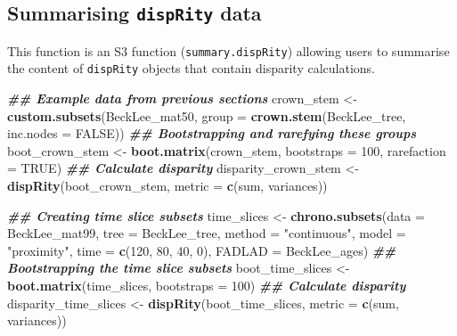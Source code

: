 \documentclass[
]{book}
\newenvironment{Shaded}{\begin{snugshade}}{\end{snugshade}}
\newcommand{\AttributeTok}[1]{\textcolor[rgb]{0.13,0.29,0.53}{#1}}
\newcommand{\ConstantTok}[1]{\textcolor[rgb]{0.56,0.35,0.01}{#1}}
\newcommand{\DecValTok}[1]{\textcolor[rgb]{0.00,0.00,0.81}{#1}}
\newcommand{\DocumentationTok}[1]{\textcolor[rgb]{0.56,0.35,0.01}{\textbf{\textit{#1}}}}
\newcommand{\FunctionTok}[1]{\textcolor[rgb]{0.13,0.29,0.53}{\textbf{#1}}}
\newcommand{\NormalTok}[1]{#1}
\newcommand{\OtherTok}[1]{\textcolor[rgb]{0.56,0.35,0.01}{#1}}
\newcommand{\StringTok}[1]{\textcolor[rgb]{0.31,0.60,0.02}{#1}}
\begin{document}
\hypertarget{summarising-disprity-data}{%
\subsection{\texorpdfstring{Summarising \texttt{dispRity} data}{Summarising dispRity data}}\label{summarising-disprity-data}}

This function is an S3 function (\texttt{summary.dispRity}) allowing users to summarise the content of \texttt{dispRity} objects that contain disparity calculations.

\begin{Shaded}
\begin{Highlighting}[]
\DocumentationTok{\#\# Example data from previous sections}
\NormalTok{crown\_stem }\OtherTok{\textless{}{-}} \FunctionTok{custom.subsets}\NormalTok{(BeckLee\_mat50,}
                             \AttributeTok{group =} \FunctionTok{crown.stem}\NormalTok{(BeckLee\_tree,}
                             \AttributeTok{inc.nodes =} \ConstantTok{FALSE}\NormalTok{))}
\DocumentationTok{\#\# Bootstrapping and rarefying these groups}
\NormalTok{boot\_crown\_stem }\OtherTok{\textless{}{-}} \FunctionTok{boot.matrix}\NormalTok{(crown\_stem, }\AttributeTok{bootstraps =} \DecValTok{100}\NormalTok{,}
                               \AttributeTok{rarefaction =} \ConstantTok{TRUE}\NormalTok{)}
\DocumentationTok{\#\# Calculate disparity}
\NormalTok{disparity\_crown\_stem }\OtherTok{\textless{}{-}} \FunctionTok{dispRity}\NormalTok{(boot\_crown\_stem,}
                                 \AttributeTok{metric =} \FunctionTok{c}\NormalTok{(sum, variances))}

\DocumentationTok{\#\# Creating time slice subsets}
\NormalTok{time\_slices }\OtherTok{\textless{}{-}} \FunctionTok{chrono.subsets}\NormalTok{(}\AttributeTok{data =}\NormalTok{ BeckLee\_mat99,}
                              \AttributeTok{tree =}\NormalTok{ BeckLee\_tree,}
                              \AttributeTok{method =} \StringTok{"continuous"}\NormalTok{,}
                              \AttributeTok{model =} \StringTok{"proximity"}\NormalTok{,}
                              \AttributeTok{time =} \FunctionTok{c}\NormalTok{(}\DecValTok{120}\NormalTok{, }\DecValTok{80}\NormalTok{, }\DecValTok{40}\NormalTok{, }\DecValTok{0}\NormalTok{),}
                              \AttributeTok{FADLAD =}\NormalTok{ BeckLee\_ages)}
\DocumentationTok{\#\# Bootstrapping the time slice subsets}
\NormalTok{boot\_time\_slices }\OtherTok{\textless{}{-}} \FunctionTok{boot.matrix}\NormalTok{(time\_slices, }\AttributeTok{bootstraps =} \DecValTok{100}\NormalTok{)}
\DocumentationTok{\#\# Calculate disparity}
\NormalTok{disparity\_time\_slices }\OtherTok{\textless{}{-}} \FunctionTok{dispRity}\NormalTok{(boot\_time\_slices,}
                                  \AttributeTok{metric =} \FunctionTok{c}\NormalTok{(sum, variances))}


\end{Highlighting}
\end{Shaded}
\end{document}
